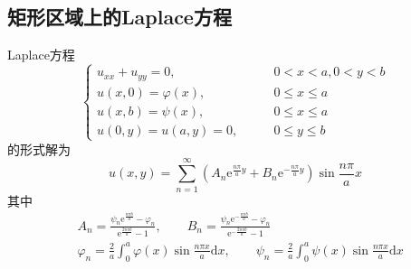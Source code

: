 \documentclass[lang = cn, scheme = chinese, thmcnt = section]{elegantbook}
\newcommand{\dd}{\mathrm{d}}           %
\newcommand{\ee}[1]{\mathrm{e}^{#1}}   %
\begin{document}
\subsection{矩形区域上的Laplace方程}

\begin{theorem}
	Laplace方程%
	$$
	\begin{cases}
		u_{xx}+u_{yy}=0,\qquad & 0<x<a,0<y<b\\
		u(x,0)=\varphi(x),\qquad & 0\le x \le a\\
		u(x,b)=\psi(x),\qquad & 0\le x \le a\\
		u(0,y)=u(a,y)=0,\qquad & 0\le y \le b
	\end{cases}
	$$
	的形式解为
	$$
	u(x,y)=\sum_{n=1}^{\infty}\left(A_n\ee{\frac{n\pi}{a}y}+B_n\ee{-\frac{n\pi}{a}y}\right)\sin\frac{n\pi}{a}x
	$$
	其中
	\begin{align*}
		& A_n=\frac{\psi_n\ee{\frac{n\pi b}{a}}-\varphi_n}{\ee{\frac{2n\pi b}{a}}-1},\qquad 
		B_n=\frac{\psi_n\ee{-\frac{n\pi b}{a}}-\varphi_n}{\ee{-\frac{2n\pi b}{a}}-1}\\
		& \varphi_n=\frac{2}{a}\int_{0}^{a}\varphi(x)\sin\frac{n\pi x}{a}\dd x,\qquad 
		\psi_n=\frac{2}{a}\int_{0}^{a}\psi(x)\sin\frac{n\pi x}{a}\dd x
	\end{align*}
\end{theorem}
\end{document}
